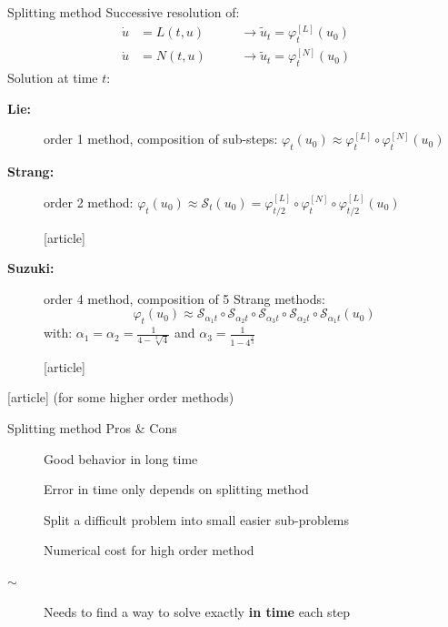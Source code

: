 \documentclass{beamer}
\newcommand{\cmark}{{\color{dgreen}\ding{52}}}
\newcommand{\xmark}{{\color{mred}\ding{55}}}
\newcommand{\bmark}{{\color{morange}$\sim$}}
\newcommand{\mbold}[1]{{\textbf{\color{PLB}#1}}}
\newcommand{\customcite}[1]{\cite{#1}}
\begin{document}
\begin{frame}{Splitting method}
  Successive resolution of:
  $$
    \begin{aligned}
      \dot{u} &= L(t,u) \qquad & \rightarrow \tilde{u}_t = \varphi^{[L]}_t(u_0) \\
      \dot{u} &= N(t,u)        & \rightarrow \tilde{u}_t = \varphi^{[N]}_t(u_0)
    \end{aligned}
  $$
  Solution at time $t$:
  \begin{description}
    \item[\mbold{Lie:}] order 1 method, composition of sub-steps:
        $\varphi_t(u_0) \approx \varphi_t^{[L]} \circ \varphi_t^{[N]}(u_0)$
    \item[\mbold{Strang:}] order 2 method:
        $\varphi_t(u_0) \approx \mathcal{S}_t(u_0) = \varphi_{t/2}^{[L]} \circ \varphi_t^{[N]} \circ \varphi_{t/2}^{[L]} (u_0)$
        \vspace{-0.25cm}
        \begin{thebibliography}{9}
          [article]
           \customcite{Strang:1968}
        \end{thebibliography}
    \item[\mbold{Suzuki:}] order 4 method, composition of 5 Strang methods:
        $$\varphi_t(u_0) \approx \mathcal{S}_{\alpha_1t}\circ\mathcal{S}_{\alpha_2t}\circ\mathcal{S}_{\alpha_3t}\circ\mathcal{S}_{\alpha_2t}\circ\mathcal{S}_{\alpha_1t}(u_0)$$
        with:
        $\alpha_1 = \alpha_2 = \frac{1}{4-\sqrt[3]{4}}$ and $\alpha_3 = \frac{1}{1-4^{\frac{2}{3}}}$
        \vspace{-0.25cm}
        \begin{thebibliography}{9}
          [article]
           \customcite{Suzuki:1990}
        \end{thebibliography}
  \end{description}

  \vspace{-0.25cm}
  \begin{thebibliography}{9}
    [article]
     \customcite{Casas:2020} \textcolor{defaultcolor}{(for some higher order methods)}
  \end{thebibliography}
\end{frame}
\begin{frame}{Splitting method}
  {Pros \& Cons}
  \begin{description}
    \item[\cmark] Good behavior in long time
    \item[\cmark] Error in time only depends on splitting method
    \item[\cmark] Split a difficult problem into small easier sub-problems
    \item[\xmark] Numerical cost for high order method
    \item[\bmark] Needs to find a way to solve exactly \mbold{in time} each step
  \end{description}
  
\end{frame}
\end{document}
